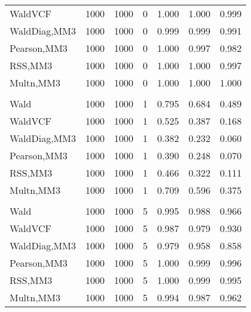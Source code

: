 \documentclass[
]{article}
\begin{document}
\begin{table}[H]
{\begin{tabular}[t]{lrrrrrr}
\hspace{1em}WaldVCF & 1000 & 1000 & 0 & 1.000 & 1.000 & 0.999\\
\hspace{1em}WaldDiag,MM3 & 1000 & 1000 & 0 & 0.999 & 0.999 & 0.991\\
\hspace{1em}Pearson,MM3 & 1000 & 1000 & 0 & 1.000 & 0.997 & 0.982\\
\hspace{1em}RSS,MM3 & 1000 & 1000 & 0 & 1.000 & 1.000 & 0.997\\
\hspace{1em}Multn,MM3 & 1000 & 1000 & 0 & 1.000 & 1.000 & 1.000\\
\addlinespace[0.3em]
\multicolumn{7}{l}{\textbf{2F 10V}}\\
\hspace{1em}Wald & 1000 & 1000 & 1 & 0.795 & 0.684 & 0.489\\
\hspace{1em}WaldVCF & 1000 & 1000 & 1 & 0.525 & 0.387 & 0.168\\
\hspace{1em}WaldDiag,MM3 & 1000 & 1000 & 1 & 0.382 & 0.232 & 0.060\\
\hspace{1em}Pearson,MM3 & 1000 & 1000 & 1 & 0.390 & 0.248 & 0.070\\
\hspace{1em}RSS,MM3 & 1000 & 1000 & 1 & 0.466 & 0.322 & 0.111\\
\hspace{1em}Multn,MM3 & 1000 & 1000 & 1 & 0.709 & 0.596 & 0.375\\
\addlinespace[0.3em]
\multicolumn{7}{l}{\textbf{3F 15V}}\\
\hspace{1em}Wald & 1000 & 1000 & 5 & 0.995 & 0.988 & 0.966\\
\hspace{1em}WaldVCF & 1000 & 1000 & 5 & 0.987 & 0.979 & 0.930\\
\hspace{1em}WaldDiag,MM3 & 1000 & 1000 & 5 & 0.979 & 0.958 & 0.858\\
\hspace{1em}Pearson,MM3 & 1000 & 1000 & 5 & 1.000 & 0.999 & 0.996\\
\hspace{1em}RSS,MM3 & 1000 & 1000 & 5 & 1.000 & 0.999 & 0.995\\
\hspace{1em}Multn,MM3 & 1000 & 1000 & 5 & 0.994 & 0.987 & 0.962\\
\bottomrule
\end{tabular}}
\endgroup{}
\end{table}
\end{document}
